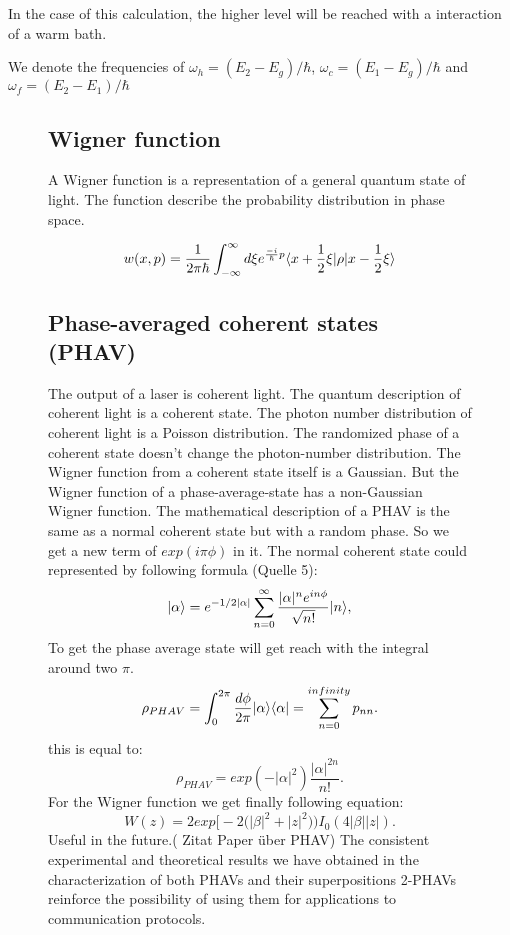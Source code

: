 \documentclass[12pt,a4paper]{article}
\DeclarePairedDelimiter\bra{\langle}{\rvert}
\DeclarePairedDelimiter\ket{\lvert}{\rangle}
\begin{document}
In the case of this calculation, the higher level will be reached with a interaction of a warm bath. 

We denote the frequencies of $\omega_h=(E_2-E_g)/\hbar$, $\omega_c=(E_1-E_g)/\hbar$ and $\omega_f=(E_2-E_1)/\hbar$
\begin{figure}[h!]
\centering


\subsection{Wigner function}
A Wigner function is a representation of a general quantum state of light.
The function describe the probability distribution in phase space.

\begin{equation}
w(x,p)=\frac{1}{2\pi \hbar}\int_{- \infty}^{\infty} d\xi e^{\frac{-i}{\hbar}p}\bra{x+\frac{1}{2}\xi}\rho\ket{x-\frac{1}{2}\xi}
\end{equation}

\newpage
\subsection{Phase-averaged coherent states (PHAV)}
The output of a laser is coherent light.
The quantum description of coherent light is a coherent state. The photon number distribution of coherent light is a Poisson distribution. The randomized phase of a coherent state doesn't change the photon-number distribution. 
The Wigner function from a coherent state itself is a Gaussian. But the Wigner function of a phase-average-state has a non-Gaussian Wigner function. 
The mathematical description of a  PHAV is the same as a normal coherent state but with a random phase. So we get a new term of $exp(i\pi\phi)$ in it. 
The normal coherent state could represented by following formula (Quelle 5):
\begin{equation}
\ket{\alpha}=e^{-1/2|\alpha|}\sum_{n=0}^{\infty}\frac{|\alpha|^n e^{in\phi}}{\sqrt{n!}} \ket{n},
\end{equation}
To get the phase average state will get reach with the integral around two $\pi$.
\begin{equation}
\rho_{PHAV}=\int_0 ^{2\pi}\frac{d\phi}{2\pi}\ket{\alpha}\bra{\alpha}=\sum_{n=0}^{infinity}p_{nn}.
\end{equation}
this is equal to:
\begin{equation}
\rho_{PHAV}= exp(-|\alpha|^2)\frac{|\alpha|^{2n}}{n!}.
\end{equation}
For the Wigner function we get finally following equation:
\begin{equation}
W(z)=2  exp\bigl[-2\bigl(|\beta|^2+|z|^2\bigr)\bigr) I_0 (4|\beta| |z|).
\end{equation}
Useful in the future.( Zitat Paper über PHAV) The consistent experimental and theoretical results we have obtained in the characterization of both PHAVs and their superpositions 2-PHAVs reinforce the
possibility of using them for applications to communication protocols. 


\end{figure}
\end{document}
